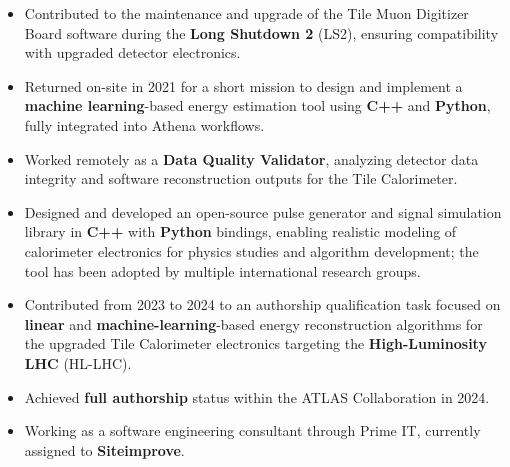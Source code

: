 \documentclass[10pt,a4paper,ragged2e]{altacv}
\begin{document}
\clearpage
{}
\begin{itemize}
    \item Contributed to the maintenance and upgrade of the Tile Muon Digitizer Board software during the \textbf{Long Shutdown 2} (LS2), ensuring compatibility with upgraded detector electronics.
    \item Returned on-site in 2021 for a short mission to design and implement a \textbf{machine learning}-based energy estimation tool using \textbf{C++} and \textbf{Python}, fully integrated into Athena workflows.
    \item Worked remotely as a \textbf{Data Quality Validator}, analyzing detector data integrity and software reconstruction outputs for the Tile Calorimeter.
    \item Designed and developed an open-source pulse generator and signal simulation library in \textbf{C++} with \textbf{Python} bindings, enabling realistic modeling of calorimeter electronics for physics studies and algorithm development; the tool has been adopted by multiple international research groups.
    \item Contributed from 2023 to 2024 to an authorship qualification task focused on \textbf{linear} and \textbf{machine-learning}-based energy reconstruction algorithms for the upgraded Tile Calorimeter electronics targeting the \textbf{High-Luminosity LHC} (HL-LHC).
	\item Achieved \textbf{full authorship} status within the ATLAS Collaboration in 2024.
\end{itemize}

\divider%

\begin{itemize}
	\item Working as a software engineering consultant through Prime IT, currently assigned to \textbf{Siteimprove}.
\end{itemize}

\divider%
\end{document}

